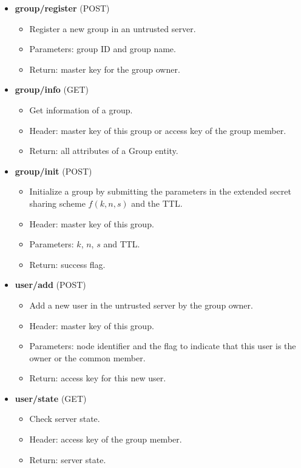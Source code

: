 \documentclass[a4paper,11pt]{report}
\begin{document}
\begin{itemize}[leftmargin=7mm]
	\setlength{\itemsep}{1pt}
	\setlength{\parskip}{0pt}
	\setlength{\parsep}{0pt}
	\item 
	\textbf{group/register} (POST)
	\begin{itemize}
		\item Register a new group in an untrusted server.
		\item Parameters: group ID and group name.
		\item Return: master key for the group owner. 
	\end{itemize}
	\item 
	\textbf{group/info} (GET)
	\begin{itemize}
		\item Get information of a group.
		\item Header: master key of this group or access key of the group member.
		\item Return: all attributes of a Group entity. 
	\end{itemize}
	\item 
	\textbf{group/init} (POST)
	\begin{itemize}
		\item Initialize a group by submitting the parameters in the extended secret sharing scheme $f(k, n, s)$ and the TTL.
		\item Header: master key of this group.
		\item Parameters: $k$, $n$, $s$ and TTL.
		\item Return: success flag.
	\end{itemize}
	\item 
	\textbf{user/add} (POST)
	\begin{itemize}
		\item Add a new user in the untrusted server by the group owner.
		\item Header: master key of this group.
		\item Parameters: node identifier and the flag to indicate that this user is the owner or the common member.
		\item Return: access key for this new user.
	\end{itemize}
	\item 
	\textbf{user/state} (GET)
	\begin{itemize}
		\item Check server state.
		\item Header: access key of the group member.
		\item Return: server state.

\end{itemize}
\end{itemize}
\end{document}
